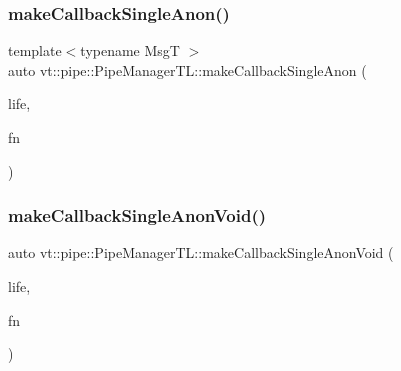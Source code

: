 \mbox{\label{structvt_1_1pipe_1_1_pipe_manager_t_l_aea9bdf9ea02e21ebd98393907ff432ea}} 
\subsubsection{\texorpdfstring{make\+Callback\+Single\+Anon()}{makeCallbackSingleAnon()}\hspace{0.1cm}{\footnotesize\ttfamily [6/6]}}
{\footnotesize\ttfamily template$<$typename MsgT $>$ \\
auto vt\+::pipe\+::\+Pipe\+Manager\+T\+L\+::make\+Callback\+Single\+Anon (\begin{DoxyParamCaption}\item[{\hyperlink{namespacevt_1_1pipe_acb42b284378c0fdac1d7c6335dc26f58}{Lifetime\+Enum}}]{life,  }\item[{\hyperlink{structvt_1_1pipe_1_1_pipe_manager_base_aa54eee64ab32a27777a672d49eb861f4}{Func\+Msg\+Type}$<$ MsgT $>$}]{fn }\end{DoxyParamCaption})}

\mbox{\label{structvt_1_1pipe_1_1_pipe_manager_t_l_ac22b018279b274ddc9a46b3abfc69a64}} 
\subsubsection{\texorpdfstring{make\+Callback\+Single\+Anon\+Void()}{makeCallbackSingleAnonVoid()}}
{\footnotesize\ttfamily auto vt\+::pipe\+::\+Pipe\+Manager\+T\+L\+::make\+Callback\+Single\+Anon\+Void (\begin{DoxyParamCaption}\item[{\hyperlink{namespacevt_1_1pipe_acb42b284378c0fdac1d7c6335dc26f58}{Lifetime\+Enum}}]{life,  }\item[{\hyperlink{structvt_1_1pipe_1_1_pipe_manager_base_acd6f0c71f38f08d53f85e83b65406d77}{Func\+Void\+Type}}]{fn }\end{DoxyParamCaption})\hspace{0.3cm}{\ttfamily [inline]}}

